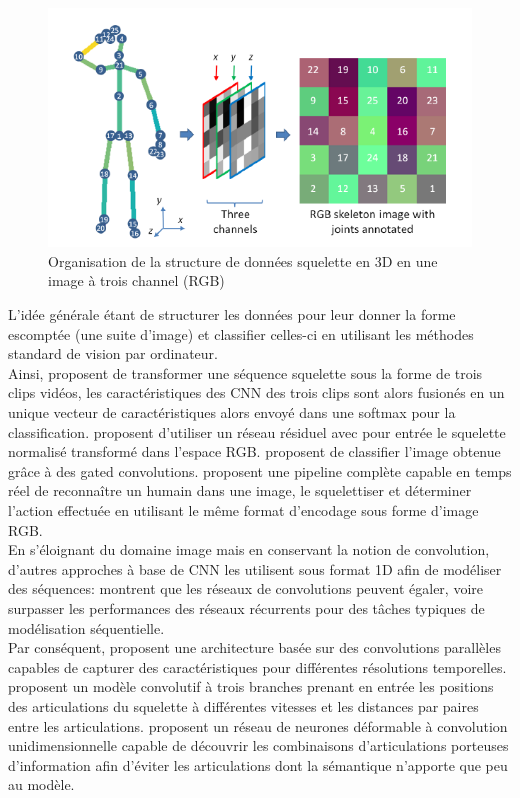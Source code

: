 \begin{figure}[H]
    \centering
    \includegraphics[width=0.5\linewidth]{Images/skeltoim.png}
    \caption{Organisation de la structure de données squelette en 3D en une image à trois channel (RGB)}
    \label{fig:skeltoim}
\end{figure}
L’idée générale étant de structurer les données pour leur donner la forme escomptée (une suite d’image) et classifier celles-ci en utilisant les méthodes standard de vision par ordinateur.\\


Ainsi, \cite{ke2017new} proposent de transformer une séquence squelette sous la forme de trois clips vidéos, les caractéristiques des CNN des trois clips sont alors fusionés en un unique vecteur de caractéristiques alors envoyé dans une softmax pour la classification.
\cite{pham2018learning} proposent d'utiliser un réseau résiduel \cite{he2016deep} avec pour entrée le squelette normalisé transformé dans l'espace RGB.
\cite{cao2018skeleton} proposent de classifier l'image obtenue grâce à des gated convolutions.
\cite{ludl2019simple} proposent une pipeline complète capable en temps réel de reconnaître un humain dans une image, le squelettiser et déterminer l'action effectuée en utilisant le même format d'encodage sous forme d'image RGB.\\

En s'éloignant du domaine image mais en conservant la notion de convolution, d'autres approches à base de CNN les utilisent sous format 1D afin de modéliser des séquences:
\cite{bai2018empirical} montrent que les réseaux de convolutions peuvent égaler, voire surpasser les performances des réseaux récurrents pour des tâches typiques de modélisation séquentielle.\\

Par conséquent, \cite{devineau2018deep} proposent une architecture basée sur des convolutions parallèles capables de capturer des caractéristiques pour différentes résolutions temporelles.
\cite{2019arXiv190709658Y} proposent un modèle convolutif à trois branches prenant en entrée les positions des articulations du squelette à différentes vitesses et les distances par paires entre les articulations.
\cite{weng2018deformable} proposent un réseau de neurones déformable à convolution unidimensionnelle capable de découvrir les combinaisons d'articulations porteuses d'information afin d'éviter les articulations dont la sémantique n'apporte que peu au modèle.



